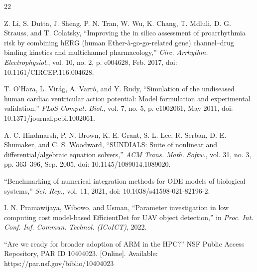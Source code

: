 \documentclass[journal]{IEEEtran}
\begin{document}
\begin{thebibliography}{22}

Z. Li, S. Dutta, J. Sheng, P. N. Tran, W. Wu, K. Chang, T. Mdluli, D. G. Strauss, and T. Colatsky, ``Improving the in silico assessment of proarrhythmia risk by combining hERG (human Ether-\`a-go-go-related gene) channel--drug binding kinetics and multichannel pharmacology,'' \emph{Circ. Arrhythm. Electrophysiol.}, vol. 10, no. 2, p. e004628, Feb. 2017, doi: 10.1161/CIRCEP.116.004628.

T. O'Hara, L. Vir\'ag, A. Varr\'o, and Y. Rudy, ``Simulation of the undiseased human cardiac ventricular action potential: Model formulation and experimental validation,'' \emph{PLoS Comput. Biol.}, vol. 7, no. 5, p. e1002061, May 2011, doi: 10.1371/journal.pcbi.1002061.

A. C. Hindmarsh, P. N. Brown, K. E. Grant, S. L. Lee, R. Serban, D. E. Shumaker, and C. S. Woodward, ``SUNDIALS: Suite of nonlinear and differential/algebraic equation solvers,'' \emph{ACM Trans. Math. Softw.}, vol. 31, no. 3, pp. 363--396, Sep. 2005, doi: 10.1145/1089014.1089020.

``Benchmarking of numerical integration methods for ODE models of biological systems,'' \emph{Sci. Rep.}, vol. 11, 2021, doi: 10.1038/s41598-021-82196-2.

I. N. Pramawijaya, Wibowo, and Usman, ``Parameter investigation in low computing cost model-based EfficientDet for UAV object detection,'' in \emph{Proc. Int. Conf. Inf. Commun. Technol. (ICoICT)}, 2022.

``Are we ready for broader adoption of ARM in the HPC?'' NSF Public Access Repository, PAR ID 10404023. [Online]. Available: https://par.nsf.gov/biblio/10404023


\end{thebibliography}
\end{document}
